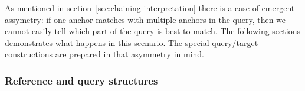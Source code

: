 As mentioned in section~\ref{sec:chaining-interpretation} there is a case of emergent assymetry: if one anchor matches with multiple anchors in the query, then we cannot easily tell which part of the query is best to match. The following sections demonstrates what happens in this scenario. The special query/target constructions are prepared in that asymmetry in mind.


\subsubsection{Reference and query structures}

